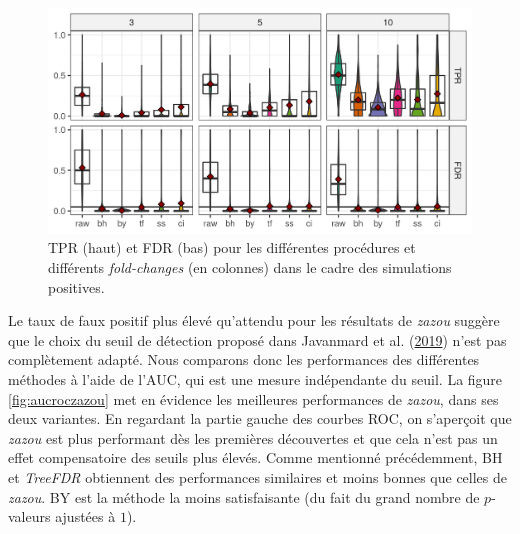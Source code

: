 \documentclass[12pt,a4paper]{reedthesis}
\theoremstyle{definition}
\theoremstyle{definition}
\theoremstyle{definition}
\theoremstyle{remark}
\begin{document}
\begin{figure}

{\centering \includegraphics[width=0.9\linewidth]{img/tprfdr_zazou} 

}

\caption{TPR (haut) et FDR (bas) pour les différentes procédures et différents \emph{fold-changes} (en colonnes) dans le cadre des simulations positives.}\label{fig:tprfdrzazou}
\end{figure}
Le taux de faux positif plus élevé qu'attendu pour les résultats de \emph{zazou} suggère que le choix du seuil de détection proposé dans Javanmard et al. (\protect\hyperlink{ref-javanmard2019false}{2019}) n'est pas complètement adapté. Nous comparons donc les performances des différentes méthodes à l'aide de l'AUC, qui est une mesure indépendante du seuil. La figure \ref{fig:aucroczazou} met en évidence les meilleures performances de \emph{zazou}, dans ses deux variantes. En regardant la partie gauche des courbes ROC, on s'aperçoit que \emph{zazou} est plus performant dès les premières découvertes et que cela n'est pas un effet compensatoire des seuils plus élevés. Comme mentionné précédemment, BH et \emph{TreeFDR} obtiennent des performances similaires et moins bonnes que celles de \emph{zazou}. BY est la méthode la moins satisfaisante (du fait du grand nombre de \(p\)-valeurs ajustées à \(1\)).
\end{document}
